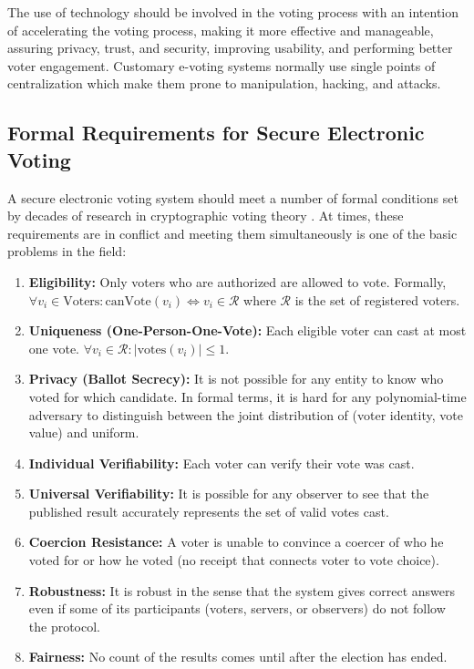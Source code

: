 \documentclass[12pt, a4paper]{report}
\begin{document}
The use of technology should be involved in the voting process with an intention of accelerating the voting process, making it more effective and manageable, assuring privacy, trust, and security, improving usability, and performing better voter engagement. Customary e-voting systems normally use single points of centralization which make them prone to manipulation, hacking, and attacks.

\subsection{Formal Requirements for Secure Electronic Voting}

A secure electronic voting system should meet a number of formal conditions set by decades of research in cryptographic voting theory \cite{benaloh1987verifiable, chaum1981untraceable, adida2008helios}. At times, these requirements are in conflict and meeting them simultaneously is one of the basic problems in the field:

\begin{enumerate}
    \item \textbf{Eligibility:}  Only voters who are authorized are allowed to vote. Formally, $\forall v_i \in \text{Voters}: \text{canVote}(v_i) \iff v_i \in \mathcal{R}$ where $\mathcal{R}$ is the set of registered voters.
    
    \item \textbf{Uniqueness (One-Person-One-Vote):} Each eligible voter can cast at most one vote. $\forall v_i \in \mathcal{R}: |\text{votes}(v_i)| \leq 1$.
    
    \item \textbf{Privacy (Ballot Secrecy):} It is not possible for any entity to know who voted for which candidate. In formal terms, it is hard for any polynomial-time adversary to distinguish between the joint distribution of (voter identity, vote value) and uniform.
    
    \item \textbf{Individual Verifiability:} Each voter can verify their vote was cast.
    
    \item \textbf{Universal Verifiability:} It is possible for any observer to see that the published result accurately represents the set of valid votes cast.
    
    \item \textbf{Coercion Resistance:} A voter is unable to convince a coercer of who he voted for or how he voted (no receipt that connects voter to vote choice).
    
    \item \textbf{Robustness:} It is robust in the sense that the system gives correct answers even if some of its participants (voters, servers, or observers) do not follow the protocol.
    
    \item \textbf{Fairness:} No count of the results comes until after the election has ended.
\end{enumerate}
\end{document}

